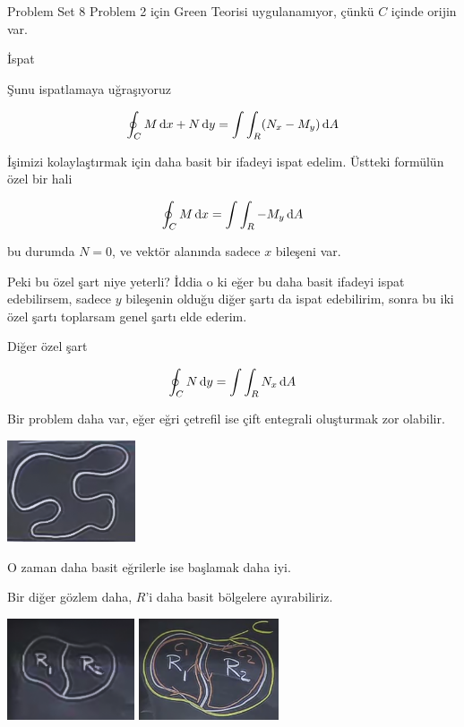 \documentclass[12pt,fleqn]{article}\usepackage{../../common}
\begin{document}
Problem Set 8 Problem 2 için Green Teorisi uygulanamıyor, çünkü $C$
içinde orijin var. 

İspat

Şunu ispatlamaya uğraşıyoruz

$$ \oint_C M \,\mathrm{d} x + N \,\mathrm{d} y = \int \int_R (N_x - M_y) \,\mathrm{d} A $$

İşimizi kolaylaştırmak için daha basit bir ifadeyi ispat edelim. Üstteki
formülün özel bir hali

$$ \oint_C M \,\mathrm{d} x  = \int \int_R -M_y \,\mathrm{d} A $$

bu durumda $N=0$, ve vektör alanında sadece $x$ bileşeni var. 

Peki bu özel şart niye yeterli? İddia o ki eğer bu daha basit ifadeyi ispat
edebilirsem, sadece $y$ bileşenin olduğu diğer şartı da ispat edebilirim,
sonra bu iki özel şartı toplarsam genel şartı elde ederim. 

Diğer özel şart

$$ \oint_C N \,\mathrm{d} y  = \int \int_R N_x \,\mathrm{d} A $$

Bir problem daha var, eğer eğri çetrefil ise çift entegrali oluşturmak zor
olabilir. 

\includegraphics[height=3cm]{22_3.png}

O zaman daha basit eğrilerle ise başlamak daha iyi. 

Bir diğer gözlem daha, $R$'i daha basit bölgelere ayırabiliriz. 

\includegraphics[height=3cm]{22_4.png}
\includegraphics[height=3cm]{22_5.png}
\end{document}
